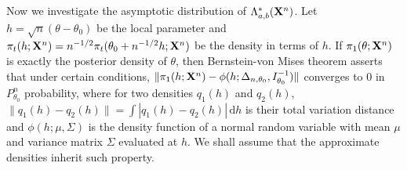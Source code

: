 \documentclass[11pt]{article}
\theoremstyle{plain}
\theoremstyle{definition}
\theoremstyle{remark}
\begin{document}
Now we investigate the asymptotic distribution of $\Lambda_{a,b}^*(\mathbf{X}^n)$.
Let $h=\sqrt{n}(\theta-\theta_0)$ be the local parameter and $\pi_t (h;\mathbf{X}^{n}) = n^{-1/2} \pi_t(\theta_0+n^{-1/2}h;\mathbf{X}^{n})$ be the density in terms of $h$.
If $\pi_1(\theta;\mathbf{X}^{n})$ is exactly the posterior density of $\theta$, then Bernstein-von Mises theorem asserts that under certain conditions,
$
            \|\pi_1(h;\mathbf{X}^{n})-\phi(h;\Delta_{n,\theta_0},I_{\theta_0}^{-1})\|
$
converges to $0$ in $P_{\theta_0}^n$ probability,
where for two densities $q_1(h)$ and $q_2(h)$, $\|q_1(h)-q_2(h)\|=\int |q_1(h)-q_2(h)|\, \mathrm d h$ is their total variation distance and $\phi(h; \mu ,\Sigma)$ is the density function of a normal random variable with mean $\mu$ and variance matrix $\Sigma$ evaluated at $h$.
We shall assume that the approximate densities inherit such property.
        
\end{document}
